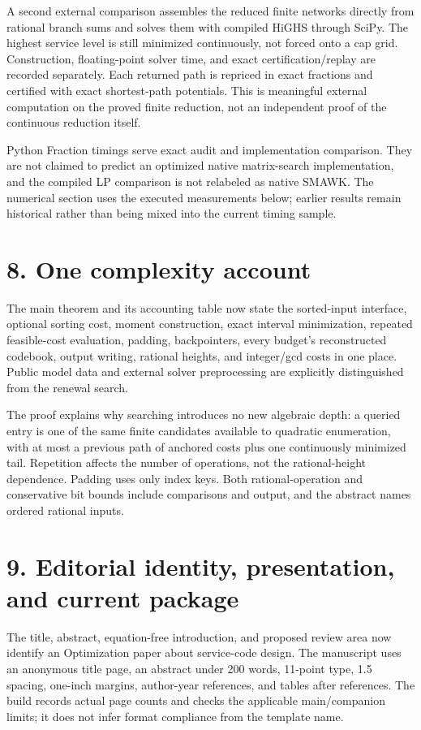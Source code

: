 \documentclass[11pt,letterpaper]{article}
\theoremstyle{definition}\newtheorem{assumption}[theorem]{Assumption}
\begin{document}
A second external comparison assembles the reduced finite networks directly from rational branch sums and solves them with compiled HiGHS through SciPy. The highest service level is still minimized continuously, not forced onto a cap grid. Construction, floating-point solver time, and exact certification/replay are recorded separately. Each returned path is repriced in exact fractions and certified with exact shortest-path potentials. This is meaningful external computation on the proved finite reduction, not an independent proof of the continuous reduction itself.

Python Fraction timings serve exact audit and implementation comparison. They are not claimed to predict an optimized native matrix-search implementation, and the compiled LP comparison is not relabeled as native SMAWK. The numerical section uses the executed measurements below; earlier results remain historical rather than being mixed into the current timing sample.

\section*{8. One complexity account}

The main theorem and its accounting table now state the sorted-input interface, optional sorting cost, moment construction, exact interval minimization, repeated feasible-cost evaluation, padding, backpointers, every budget's reconstructed codebook, output writing, rational heights, and integer/gcd costs in one place. Public model data and external solver preprocessing are explicitly distinguished from the renewal search.

The proof explains why searching introduces no new algebraic depth: a queried entry is one of the same finite candidates available to quadratic enumeration, with at most a previous path of anchored costs plus one continuously minimized tail. Repetition affects the number of operations, not the rational-height dependence. Padding uses only index keys. Both rational-operation and conservative bit bounds include comparisons and output, and the abstract names ordered rational inputs.

\section*{9. Editorial identity, presentation, and current package}

The title, abstract, equation-free introduction, and proposed review area now identify an Optimization paper about service-code design. The manuscript uses an anonymous title page, an abstract under 200 words, 11-point type, 1.5 spacing, one-inch margins, author-year references, and tables after references. The build records actual page counts and checks the applicable main/companion limits; it does not infer format compliance from the template name.
\end{document}
